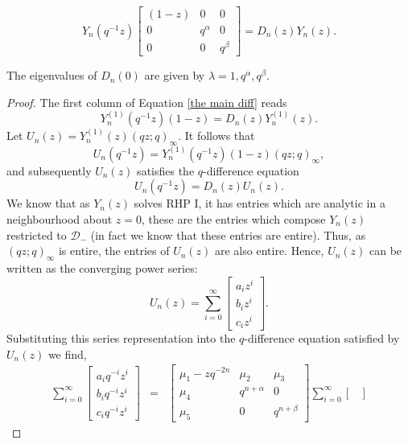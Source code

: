 \documentclass[10pt,a4paper]{amsart}
\begin{document}
\begin{equation}\label{the main diff}
    Y_n(q^{-1}z) \begin{bmatrix}
   (1-z) &
   0 &
   0 \\
   0 &
   q^{\alpha} &
   0\\
   0&0&q^{\beta}
\end{bmatrix} = D_n(z)Y_n(z).
\end{equation}

\begin{lemma}
    The eigenvalues of $D_n(0)$ are given by $\lambda = 1,q^{\alpha},q^{\beta}$.
\end{lemma}

\begin{proof}
    The first column of Equation \eqref{the main diff} reads
    \[ Y_n^{(1)}(q^{-1}z)(1-z) = D_n(z)Y_n^{(1)}(z) .\]
    Let $U_n(z) = Y_n^{(1)}(z)(qz;q)_\infty$. It follows that 
    \[ U_n(q^{-1}z) = Y_n^{(1)}(q^{-1}z)(1-z)(qz;q)_\infty,\]
    and subsequently $U_n(z)$ satisfies the $q$-difference equation
    \[ U_n(q^{-1}z) = D_n(z)U_n(z) .\]
    We know that as $Y_n(z)$ solves RHP I, it has entries which are analytic in a neighbourhood about $z=0$, these are the entries which compose $Y_n(z)$ restricted to $\mathcal{D}_-$ (in fact we know that these entries are entire). Thus, as $(qz;q)_\infty$ is entire, the entries of $U_n(z)$ are also entire. Hence, $U_n(z)$ can be written as the converging power series:
\begin{equation}
    U_n(z) =  \sum_{i=0}^\infty\begin{bmatrix}
   a_i z^i\\
   b_i z^i\\
    c_i z^i
\end{bmatrix}.
\end{equation}
Substituting this series representation into the $q$-difference equation satisfied by $U_n(z)$ we find,
\begin{eqnarray*}
   \sum_{i=0}^\infty\begin{bmatrix}
   a_i q^{-i}z^i\\
   b_i q^{-i}z^i\\
    c_i q^{-i}z^i
 \end{bmatrix}&=& \begin{bmatrix}
    \mu_{1}-zq^{-2n} & \mu_{2} &\mu_{3}\\
   \mu_{4}&q^{n+\alpha}&0 \\
   \mu_{5}&0&q^{n+\beta}
   \end{bmatrix}\sum_{i=0}^\infty\begin{bmatrix}

\end{bmatrix}
\end{eqnarray*}
\end{proof}
\end{document}
